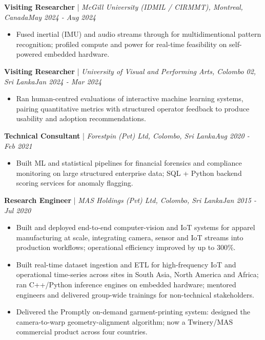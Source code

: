 \documentclass[11pt]{article}
\newenvironment{cvrole}[5]{%
  \par\noindent\textbf{\large #1} | \textit{\small #2, #3}\hfill \textit{\small #4 - #5}\par
  \begin{itemize}[leftmargin=2em, itemsep=-0.3em, topsep=-0.5em]%
}{%
  \end{itemize}\par\noindent\mbox{}\par\vspace{0.1em}%
}
\begin{document}
\begin{cvrole}{Visiting Researcher}{McGill University (IDMIL / CIRMMT)}{Montreal, Canada}{May 2024}{Aug 2024}
    \item Fused inertial (IMU) and audio streams through for multidimentional pattern recognition; profiled compute and power for real-time feasibility on self-powered embedded hardware.
\end{cvrole}

\begin{cvrole}{Visiting Researcher}{University of Visual and Performing Arts}{Colombo 02, Sri Lanka}{Jan 2024}{Mar 2024}
    \item Ran human-centred evaluations of interactive machine learning systems, pairing quantitative metrics with structured operator feedback to produce usability and adoption recommendations.
\end{cvrole}

\begin{cvrole}{Technical Consultant}{Forestpin (Pvt) Ltd}{Colombo, Sri Lanka}{Aug 2020}{Feb 2021}
    \item Built ML and statistical pipelines for financial forensics and compliance monitoring on large structured enterprise data; SQL + Python backend scoring services for anomaly flagging.
\end{cvrole}

\begin{cvrole}{Research Engineer}{MAS Holdings (Pvt) Ltd}{Colombo, Sri Lanka}{Jan 2015}{Jul 2020}
    \item Built and deployed end-to-end computer-vision and IoT systems for apparel manufacturing at scale, integrating camera, sensor and IoT streams into production workflows; operational efficiency improved by up to 300\%.
    \item Built real-time dataset ingestion and ETL for high-frequency IoT and operational time-series across sites in South Asia, North America and Africa; ran C++/Python inference engines on embedded hardware; mentored engineers and delivered group-wide trainings for non-technical stakeholders.
    \item Delivered the Promptly on-demand garment-printing system: designed the camera-to-warp geometry-alignment algorithm; now a Twinery/MAS commercial product across four countries.
\end{cvrole}
\end{document}
